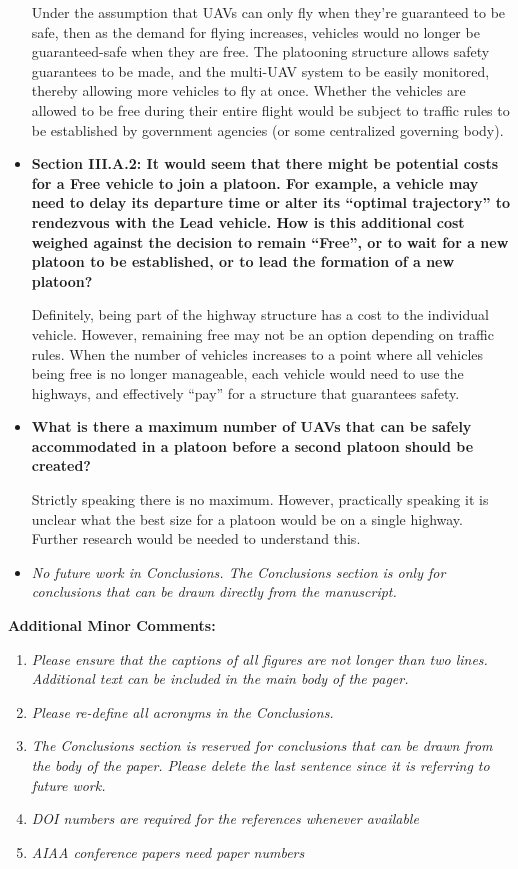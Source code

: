 \documentclass[submit]{aiaa-pretty}
\begin{document}
\begin{itemize}
Under the assumption that UAVs can only fly when they're guaranteed to be safe, then as the demand for flying increases, vehicles would no longer be guaranteed-safe when they are free. The platooning structure allows safety guarantees to be made, and the multi-UAV system to be easily monitored, thereby allowing more vehicles to fly at once. Whether the vehicles are allowed to be free during their entire flight would be subject to traffic rules to be established by government agencies (or some centralized governing body).

\item\textbf{Section III.A.2: It would seem that there might be potential costs for a Free vehicle to join a platoon.  For example, a vehicle may need to delay its departure time or alter its “optimal trajectory” to rendezvous with the Lead vehicle.  How is this additional cost weighed against the decision to remain “Free”, or to wait for a new platoon to be established, or to lead the formation of a new platoon?}

Definitely, being part of the highway structure has a cost to the individual vehicle. However, remaining free may not be an option depending on traffic rules. When the number of vehicles increases to a point where all vehicles being free is no longer manageable, each vehicle would need to use the highways, and effectively ``pay'' for a structure that guarantees safety.

\item\textbf{What is there a maximum number of UAVs that can be safely accommodated in a platoon before a second platoon should be created?}

Strictly speaking there is no maximum. However, practically speaking it is unclear what the best size for a platoon would be on a single highway. Further research would be needed to understand this.

\item\textit{No future work in Conclusions.  The Conclusions section is only for conclusions that can be drawn directly from the manuscript.}
\end{itemize}

\textbf{Additional Minor Comments:}
\begin{enumerate}
\item \textit{Please ensure that the captions of all figures are not longer than two lines.  Additional text can be included in the main body of the pager.}
\item \textit{Please re-define all acronyms in the Conclusions.}
\item \textit{The Conclusions section is reserved for conclusions that can be drawn from the body of the paper.  Please delete the last sentence since it is referring to future work.}
\item \textit{DOI numbers are required for the references whenever available}
\item \textit{AIAA conference papers need paper numbers}
\end{enumerate}
\end{document}
